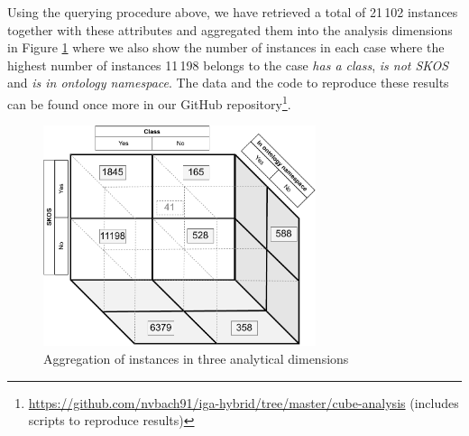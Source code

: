Using the querying procedure above, we have retrieved a total of 21\,102 instances together with these attributes and aggregated them into the analysis dimensions in Figure \ref{fig:cube-aggregation} where we also show the number of instances in each case where the highest number of instances 11\,198 belongs to the case \textit{has a class}, \textit{is not SKOS} and \textit{is in ontology namespace}. The data and the code to reproduce these results can be found once more in our GitHub repository\footnote{\url{https://github.com/nvbach91/iga-hybrid/tree/master/cube-analysis} (includes scripts to reproduce results)}.

\begin{figure}[ht]
    \centering
    \includegraphics[width=8cm]{figures/cube-aggregation.pdf}
    \caption{Aggregation of instances in three analytical dimensions}
    \label{fig:cube-aggregation}
\end{figure}
